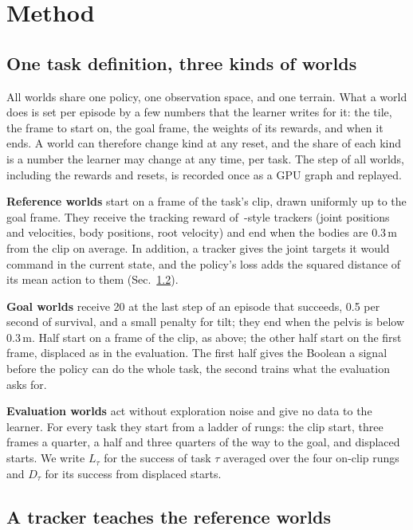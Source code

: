 \section{Method}
\label{sec:method}

\subsection{One task definition, three kinds of worlds}

All worlds share one policy, one observation space, and one terrain. What a world does is set per episode by a few numbers that the learner writes for it: the tile, the frame to start on, the goal frame, the weights of its rewards, and when it ends. A world can therefore change kind at any reset, and the share of each kind is a number the learner may change at any time, per task. The step of all worlds, including the rewards and resets, is recorded once as a GPU graph and replayed.

\textbf{Reference worlds} start on a frame of the task's clip, drawn uniformly up to the goal frame. They receive the tracking reward of~\cite{deepmimic}-style trackers (joint positions and velocities, body positions, root velocity) and end when the bodies are 0.3\,m from the clip on average. In addition, a tracker gives the joint targets it would command in the current state, and the policy's loss adds the squared distance of its mean action to them (Sec.~\ref{sec:tracker}).

\textbf{Goal worlds} receive 20 at the last step of an episode that succeeds, 0.5 per second of survival, and a small penalty for tilt; they end when the pelvis is below 0.3\,m. Half start on a frame of the clip, as above; the other half start on the first frame, displaced as in the evaluation. The first half gives the Boolean a signal before the policy can do the whole task, the second trains what the evaluation asks for.

\textbf{Evaluation worlds} act without exploration noise and give no data to the learner. For every task they start from a ladder of rungs: the clip start, three frames a quarter, a half and three quarters of the way to the goal, and displaced starts. We write $L_\tau$ for the success of task $\tau$ averaged over the four on-clip rungs and $D_\tau$ for its success from displaced starts.

\subsection{A tracker teaches the reference worlds}
\label{sec:tracker}

